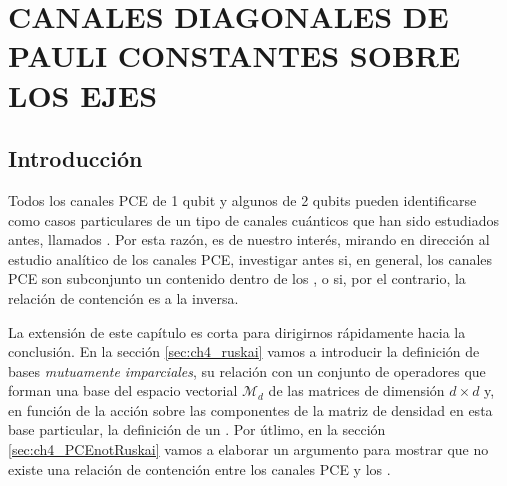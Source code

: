 \chapter{CANALES DIAGONALES DE PAULI CONSTANTES SOBRE LOS EJES}

\section{Introducción} %
Todos los canales PCE de 1 qubit y algunos de 2 qubits pueden identificarse como
casos particulares de un tipo de canales cuánticos que han sido 
estudiados antes, llamados
\ruskai{} \cite{nathanson2007pauli}. Por esta razón, es de nuestro interés,
mirando en dirección al estudio analítico de los canales PCE, investigar antes
si, en general, los canales PCE son subconjunto un contenido dentro de los 
\ruskai{}, o si, por el contrario, la relación de contención es a la inversa.

La extensión de este capítulo es corta para dirigirnos rápidamente 
hacia la conclusión. En la sección \ref{sec:ch4_ruskai} vamos a introducir la 
definición de bases \textit{mutuamente imparciales}, su relación con un
conjunto de operadores que forman una base del espacio vectorial $\mathcal{M}_d$
de las matrices de dimensión $d\times d$
y, en función de la acción sobre las componentes de la matriz de densidad 
en esta base particular, la definición de un \ruskaiMap{}. Por útlimo, en la sección 
\ref{sec:ch4_PCEnotRuskai} vamos a elaborar un argumento para mostrar 
que no existe una relación de contención entre los canales PCE y los \ruskai{}.



